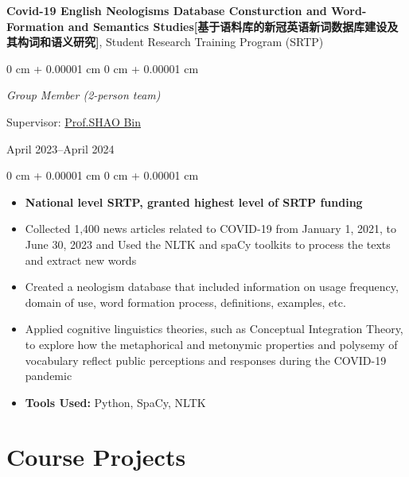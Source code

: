 \documentclass[10pt, letterpaper]{article}
\newenvironment{highlights}{
    \begin{itemize}[
        topsep=0.10 cm,
        parsep=0.10 cm,
        partopsep=0pt,
        itemsep=0pt,
        leftmargin=0 cm + 10pt
    ]
}{
    \end{itemize}
} %
\newenvironment{onecolentry}{
    \begin{adjustwidth}{
        0 cm + 0.00001 cm
    }{
        0 cm + 0.00001 cm
    }
}{
    \end{adjustwidth}
} %
\newenvironment{twocolentry}[2][]{
    \onecolentry
    \def\secondColumn{#2}
    \setcolumnwidth{\fill, 4.5 cm}
    \begin{paracol}{2}
}{
    \switchcolumn \raggedleft \secondColumn
    \end{paracol}
    \endonecolentry
} %
\let\hrefWithoutArrow\href
\begin{document}
    \vspace{0.3 cm}

    \textbf{Covid-19 English Neologisms Database Consturction and Word-Formation and Semantics Studies[基于语料库的新冠英语新词数据库建设及其构词和语义研究]}, Student Research Training Program (SRTP)

    \vspace{0.10 cm}

    \begin{twocolentry}{
        April 2023–April 2024
    }
       \textit{Group Member (2-person team)}
        \item Supervisor: \hrefWithoutArrow{https://person.zju.edu.cn/0019161#942922}{Prof.SHAO Bin}
    
    \end{twocolentry}

    \vspace{0.10 cm}
    \begin{onecolentry}
        \begin{highlights}
            \item \textbf{National level SRTP, granted highest level of SRTP funding}
            \item Collected 1,400 news articles related to COVID-19 from January 1, 2021, to June 30, 2023 and Used the NLTK and spaCy toolkits to process the texts and extract new words
            \item Created a neologism database that included information on usage frequency, domain of use, word formation process, definitions, examples, etc.
            \item Applied cognitive linguistics theories, such as Conceptual Integration Theory, to explore how the metaphorical and metonymic properties and polysemy of vocabulary reflect public perceptions and responses during the COVID-19 pandemic
            \item \textbf{Tools Used:} Python, SpaCy, NLTK
        \end{highlights}
    \end{onecolentry}
    
\section{Course Projects}
\end{document}
